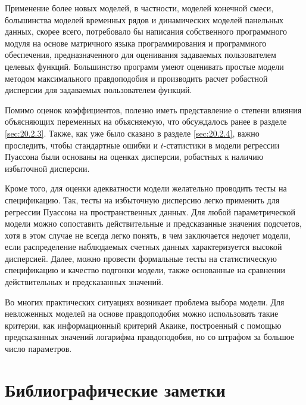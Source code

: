 Применение более новых моделей, в частности, моделей конечной смеси, большинства моделей временных рядов и динамических моделей панельных данных, скорее всего, потребовало бы написания собственного программного модуля на основе матричного языка программирования и программного обеспечения, предназначенного для оценивания задаваемых пользователем целевых функций. Большинство программ умеют оценивать простые модели методом максимального правдоподобия и производить расчет робастной дисперсии для задаваемых пользователем функций.

Помимо оценок коэффициентов, полезно иметь представление о степени влияния объясняющих переменных на объясняемую, что обсуждалось ранее в разделе \ref{sec:20.2.3}. Также, как уже было сказано в разделе \ref{sec:20.2.4}, важно проследить, чтобы стандартные ошибки и $t$-статистики в модели регрессии Пуассона были основаны на оценках дисперсии, робастных к наличию избыточной дисперсии.

Кроме того, для оценки адекватности модели желательно проводить тесты на спецификацию. Так, тесты на избыточную дисперсию легко применить для регрессии Пуассона на пространственных данных. Для любой параметрической модели можно сопоставить действительные и предсказанные значения подсчетов, хотя в этом случае не всегда легко понять, в чем заключается недочет модели, если распределение наблюдаемых счетных данных характеризуется высокой дисперсией. Далее, можно провести формальные тесты на статистическую спецификацию и качество подгонки модели, также основанные на сравнении действительных и предсказанных значений.

Во многих практических ситуациях возникает проблема выбора модели. Для невложенных моделей на основе правдоподобия можно использовать такие критерии, как информационный критерий Акаике, построенный с помощью предсказанных значений логарифма правдоподобия, но со штрафом за большое число параметров.




\section{Библиографические заметки}\label{sec:20.9}

